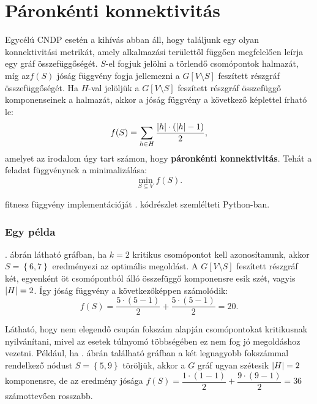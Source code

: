 \section{Páronkénti konnektivitás}\label{sec:PAIRWISE_CONNECTIVITY}
Egycélú CNDP esetén a kihívás abban áll, hogy találjunk egy olyan konnektivitási metrikát,
amely alkalmazási területtől függően megfelelően leírja egy gráf összefüggőségét.
$S$-el fogjuk jelölni a törlendő csomópontok halmazát,
míg az$f(S)$ jóság függvény fogja jellemezni a $G[V \setminus S]$ feszített részgráf összefüggőségét.
Ha $H$-val jelöljük a $G[V \setminus S]$ feszített részgráf összefüggő komponenseinek a halmazát,
akkor a jóság függvény a következő képlettel írható le:
\begin{equation}\label{eqn:PAIRWISE_CONNECTIVITY}
  f(S) = \sum_{h \in H} \frac{\lvert h\rvert \cdot (\lvert h\rvert - 1)}{2},
\end{equation}
amelyet az irodalom \cite{ventresca2012global, aringhieri2016general} úgy tart számon,
hogy \textbf{páronkénti konnektivitás}.
Tehát a feladat  függvénynek a minimalizálása:
\begin{equation}\label{eqn:MIN_PAIRWISE_CONNECTIVITY}
  \min_{S \subseteq V} f(S).
\end{equation}

 fitnesz függvény implementációját . kódrészlet szemlélteti Python-ban.



\subsubsection{Egy példa}
. ábrán látható gráfban,
ha $k = 2$ kritikus csomópontot kell azonosítanunk,
akkor $S = \left\{ 6, 7 \right\}$ eredményezi az optimális megoldást.
A $G\left[ V \setminus S \right]$ feszített részgráf két, egyenként öt csomópontból álló összefüggő komponensre esik szét,
vagyis $\lvert H\rvert = 2$. Így  jóság függvény a következőképpen számolódik:
\[
  f(S) = \dfrac{5 \cdot (5 - 1)}{2} + \dfrac{5 \cdot (5 - 1)}{2} = 20.
\]

Látható, hogy nem elegendő csupán fokszám alapján csomópontokat kritikusnak nyilvánítani,
mivel az esetek túlnyomó többségében ez nem fog jó megoldáshoz vezetni.
Például, ha . ábrán található gráfban a két legnagyobb fokszámmal rendelkező nódust $S = \left\{5,9\right\}$ töröljük,
akkor a $G$ gráf ugyan szétesik $\lvert H\rvert = 2$ komponensre,
de az eredmény jósága $f(S) = \dfrac{1 \cdot (1 - 1)}{2} + \dfrac{9 \cdot (9 - 1)}{2} = 36$ számottevően rosszabb.


